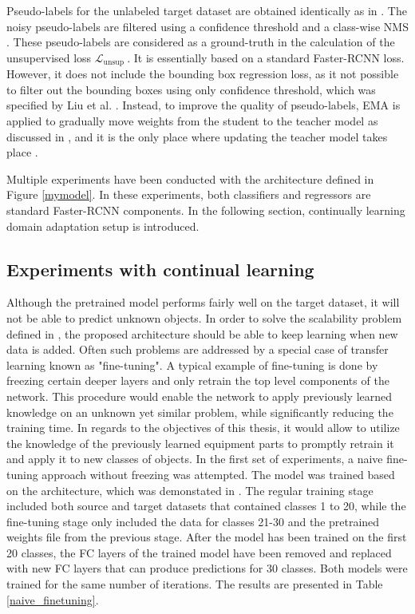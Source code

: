 \documentclass[english, 12pt, a4paper, elec, utf8, a-1b, online]{aaltothesis}
\begin{document}
Pseudo-labels for the unlabeled target dataset are obtained identically as in \cite{Li2021}. The noisy pseudo-labels are filtered using a confidence threshold and a class-wise NMS \cite{Liu2021}. These pseudo-labels are considered as a ground-truth in the calculation of the unsupervised loss $\mathcal{L}_{\text {unsup }}$. It is essentially based on a standard Faster-RCNN loss. However, it does not include the bounding box regression loss, as it not possible to filter out the bounding boxes using only confidence threshold, which was specified by Liu et al. \cite{Liu2021}.  Instead, to improve the quality of pseudo-labels, EMA is applied to gradually move weights from the student to the teacher model as discussed in , and it is the only place where updating the teacher model takes place \cite{Li2021}.  
 
Multiple experiments have been conducted with the architecture defined in Figure \ref{mymodel}. In these experiments, both classifiers and regressors are standard Faster-RCNN components. In the following section, continually learning domain adaptation setup is introduced. 


\subsection{Experiments with continual learning}

Although the pretrained model performs fairly well on the target dataset, it will not be able to predict unknown objects. In order to solve the scalability problem defined in , the proposed architecture should be able to keep learning when new data is added. Often such problems are addressed by a special case of transfer learning known as "fine-tuning". A typical example of fine-tuning is done by freezing certain deeper layers and only retrain the top level components of the network. This procedure would enable the network to apply previously learned knowledge on an unknown yet similar problem, while significantly reducing the training time. In regards to the objectives of this thesis, it would allow to utilize the knowledge of the previously learned equipment parts to promptly retrain it and apply it to new classes of objects. 
In the first set of experiments, a naive fine-tuning approach without freezing was attempted. The model was trained based on the architecture, which was demonstated in . The regular training stage included both source and target datasets that contained classes 1 to 20, while the fine-tuning stage only included the data for classes 21-30 and the pretrained weights file from the previous stage. After the model has been trained on the first 20 classes, the FC layers of the trained model have been removed and replaced with new FC layers that can produce predictions for 30 classes. Both models were trained for the same number of iterations. The results are presented in Table \ref{naive_finetuning}.
\end{document}
